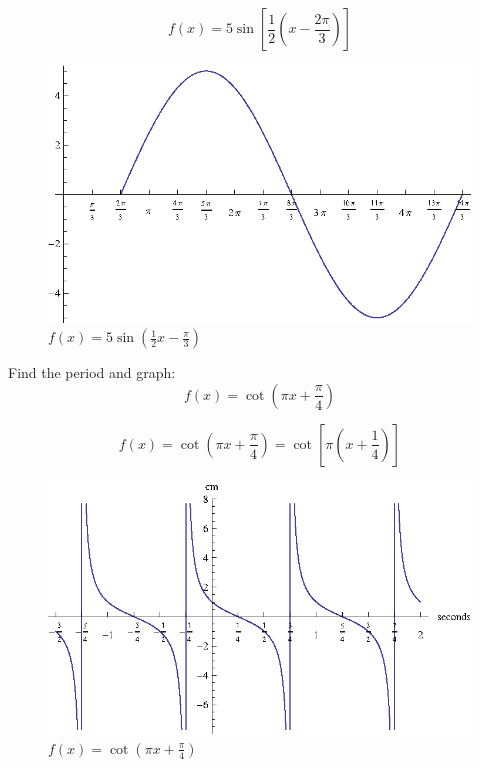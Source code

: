 \documentclass[fleqn,addpoints]{exam}
\begin{document}
\begin{questions}
      \begin{solution}
        \[
          f(x) = 5 \sin \left[ \frac{1}{2} \left( x - \frac{2 \pi}{3} \right) \right]
        \]

        \begin{figure}[H]
          \centering
          \includegraphics{graph1.eps}
          \caption{$f(x) = 5 \sin \left( \frac{1}{2} x - \frac{\pi}{3} \right)$}
        \end{figure}

      \end{solution}

    \question[10]
      Find the period and graph:
      \[
        f(x) = \cot \left( \pi x + \frac{\pi}{4} \right)
      \]

      \begin{solution}
        \[
          f(x) = \cot \left( \pi x + \frac{\pi}{4} \right) = \cot \left[ \pi \left( x + \frac{1}{4} \right) \right ]
        \]

        \begin{figure}[H]
          \centering
          \includegraphics{graph2.eps}
          \caption{$f(x) = \cot \left( \pi x + \frac{\pi}{4} \right)$}
        \end{figure}


\end{solution}
\end{questions}
\end{document}

